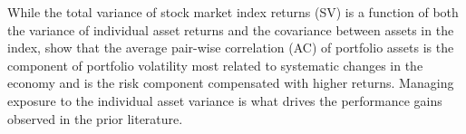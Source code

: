 While the total variance of stock market index returns (SV) is a function of both the variance of individual asset returns and the covariance between assets in the index, \citet{pollet_average_2010} show that the average pair-wise correlation (AC) of portfolio assets is the component of portfolio volatility most related to systematic changes in the economy and is the risk component compensated with higher returns. Managing exposure to the individual asset variance is what drives the performance gains observed in the prior literature. 

